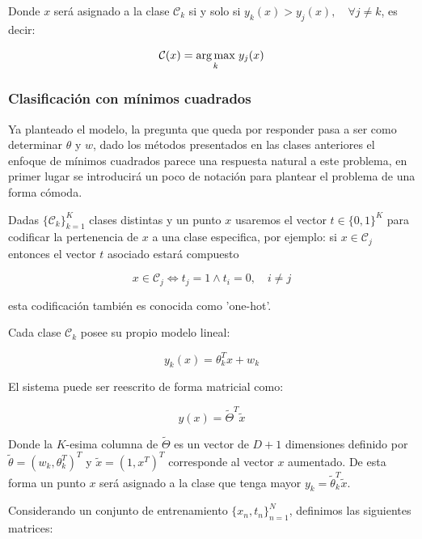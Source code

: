 Donde $x$ será asignado a la clase $\mathcal{C}_k$ si y solo si $y_k(x) > y_j(x),\quad \forall j\neq k$, es decir:

\begin{equation}
    \mathcal{C}(x) = \underset{k}{\operatorname*{arg\,max}}\hspace{1mm} y_j(x)
\end{equation}

\subsubsection{Clasificación con mínimos cuadrados}

Ya planteado el modelo, la pregunta que queda por responder pasa a ser como determinar $\theta$ y $w$, dado los métodos presentados en las clases anteriores el enfoque de mínimos cuadrados parece una respuesta natural a este problema, en primer lugar se introducirá un poco de notación para plantear el problema de una forma cómoda.

Dadas $\{\mathcal{C}_k\}_{k=1}^K$ clases distintas y un punto $x$ usaremos el vector $t\in\{0,1\}^K$ para codificar la pertenencia de $x$ a una clase especifica, por ejemplo: si $x\in\mathcal{C}_j$ entonces el vector $t$ asociado estará compuesto 

\begin{equation}
    x\in\mathcal{C}_j \Leftrightarrow t_j=1 \wedge t_i=0, \quad i\neq j
\end{equation}

esta codificación también es conocida como 'one-hot'.

Cada clase $\mathcal{C}_k$ posee su propio modelo lineal:

\begin{equation}
    y_k(x) = \theta_k^Tx + w_k \nonumber
\end{equation}

El sistema puede ser reescrito de forma matricial como:

\begin{equation}
    y(x) = \tilde{\Theta}^T\tilde{x}
\end{equation}

Donde la $K$-esima columna de $\tilde{\Theta}$ es un vector de $D+1$ dimensiones definido por $\tilde{\theta}=(w_k, \theta_k^T)^T$ y $\tilde{x}=(1,x^T)^T$ corresponde al vector $x$ aumentado. De esta forma un punto $x$ será asignado a la clase que tenga mayor $y_k=\tilde{\theta}_k^T\tilde{x}$.

Considerando un conjunto de entrenamiento $\{x_n,t_n\}_{n=1}^N$, definimos las siguientes matrices:

